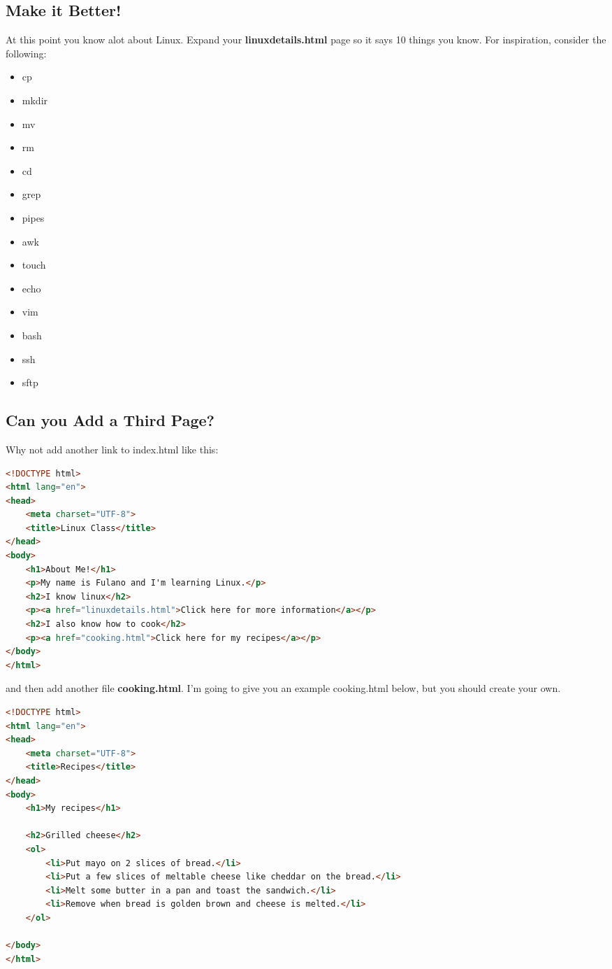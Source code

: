 \documentclass[12pt]{article}
\begin{document}
\subsection{Make it Better!}

At this point you know alot about Linux. Expand your \textbf{linuxdetails.html} page so it says 10 things you know. For inspiration, consider the following:
\begin{multicols}{4}
\begin{itemize}
    \item cp
    \item mkdir
    \item mv
    \item rm
    \item cd
    \item grep
    \item pipes
    \item awk
    \item touch
    \item echo
    \item vim
    \item bash
    \item ssh
    \item sftp
\end{itemize}
\end{multicols}

\subsection{Can you Add a Third Page?}
Why not add another link to index.html like this:

\begin{lstlisting}[language=html]
<!DOCTYPE html>
<html lang="en">
<head>
    <meta charset="UTF-8">
    <title>Linux Class</title>
</head>
<body>
    <h1>About Me!</h1>
    <p>My name is Fulano and I'm learning Linux.</p>
    <h2>I know linux</h2>
    <p><a href="linuxdetails.html">Click here for more information</a></p>
    <h2>I also know how to cook</h2>
    <p><a href="cooking.html">Click here for my recipes</a></p>
</body>
</html>
\end{lstlisting}

and then add another file \textbf{cooking.html}. I'm going to give you an example cooking.html below, but you should create your own.

\begin{lstlisting}[language=html]
<!DOCTYPE html>
<html lang="en">
<head>
    <meta charset="UTF-8">
    <title>Recipes</title>
</head>
<body>
    <h1>My recipes</h1>

    <h2>Grilled cheese</h2>
    <ol>
        <li>Put mayo on 2 slices of bread.</li>
        <li>Put a few slices of meltable cheese like cheddar on the bread.</li>
        <li>Melt some butter in a pan and toast the sandwich.</li>
        <li>Remove when bread is golden brown and cheese is melted.</li>
    </ol>
    
</body>
</html>
\end{lstlisting}
\end{document}

